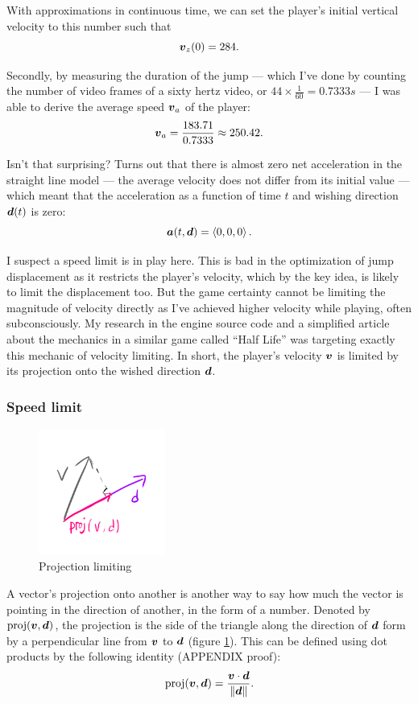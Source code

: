 With approximations in continuous time, we can set the player's initial vertical velocity to this number such that
\[
    \boldsymbol{v}_{z}(0) = 284.
\]


Secondly, by measuring the duration of the jump --- which I've done by counting the number of video frames of a sixty hertz video, or $44 \times \frac{1}{60} = 0.7333 \si{s}$ --- I was able to derive the average speed $\boldsymbol{v}_{a}$ of the player:
\[
    \boldsymbol{v}_{a} = \frac{183.71}{0.7333} \approx 250.42.
\]

Isn't that surprising? Turns out that there is almost zero net acceleration in the straight line model --- the average velocity does not differ from its initial value --- which meant that the acceleration as a function of time $t$ and wishing direction $\boldsymbol{d}(t)$ is zero:
\[
    \boldsymbol{a}(t, \boldsymbol{d}) = \left\langle 0, 0, 0 \right\rangle.
\]

I suspect a speed limit is in play here. This is bad in the optimization of jump displacement as it restricts the player's velocity, which by the key idea, is likely to limit the displacement too. But the game certainty cannot be limiting the magnitude of velocity directly as I've achieved higher velocity while playing, often subconsciously. My research in the engine source code \parencite{valvesoftware} and a simplified article about the mechanics in a similar game called ``Half Life'' \parencite{jwchong} was targeting exactly this mechanic of velocity limiting. In short, the player's velocity $\boldsymbol{v}$ is limited by its projection onto the wished direction $\boldsymbol{d}$.

\subsubsection{Speed limit}
\begin{figure}
    \includegraphics[width=0.37\textwidth,right]{assets/2proj.png}
    \caption{Projection limiting}
    \label{fig:2proj}
\end{figure}
A vector's projection onto another is another way to say how much the vector is pointing in the direction of another, in the form of a number. Denoted by $\text{proj}(\boldsymbol{v}, \boldsymbol{d})$, the projection is the side of the triangle along the direction of $\boldsymbol{d}$ form by a perpendicular line from $\boldsymbol{v}$ to $\boldsymbol{d}$ (figure \ref{fig:2proj}). This can be defined using dot products by the following identity (APPENDIX proof):
\[
    \text{proj}(\boldsymbol{v}, \boldsymbol{d}) = \frac{\boldsymbol{v} \cdot \boldsymbol{d}}{\|\boldsymbol{d}\|}.
\]

